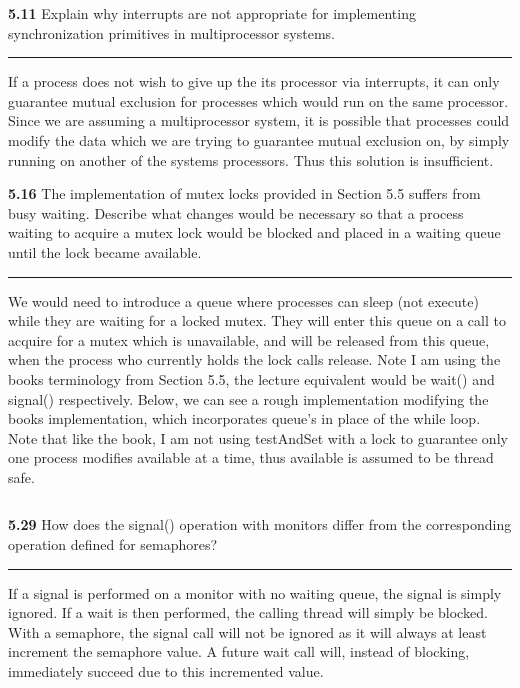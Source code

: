 \documentclass[12pt]{jhwhw}
\begin{document}
\textbf{5.11}  
	Explain why interrupts are not appropriate for implementing synchronization
	primitives in multiprocessor systems.
\textcolor[RGB]{240,240,240}{\rule{\textwidth}{0.5pt}}\bigbreak

	\begin{addmargin}[1em]{}
		If a process does not wish to give up the its processor via interrupts, it
		can only guarantee mutual exclusion for processes which would run on the
		same processor. Since we are assuming a multiprocessor system, it is possible
		that processes could modify the data which we are trying to guarantee mutual
		exclusion on, by simply running on another of the systems processors.
		Thus this solution is insufficient.
	\end{addmargin}
	\bigbreak

\textbf{5.16}  
	The implementation of mutex locks provided in Section 5.5 suffers
	from busy waiting. Describe what changes would be necessary so that a process 
	waiting to acquire a mutex lock would be blocked and placed in a waiting queue
	until the lock became available.
\textcolor[RGB]{240,240,240}{\rule{\textwidth}{0.5pt}}\bigbreak

	\begin{addmargin}[1em]{}
		We would need to introduce a queue where processes  can sleep (not execute)
		while they are waiting for a locked mutex. They will enter this queue
		on a call to acquire for a mutex which is unavailable, and will be released
		from this queue, when the process who currently holds the lock calls release.
		Note I am using the books terminology from Section 5.5, the lecture equivalent
		would be wait() and signal() respectively.
		Below, we can see a rough implementation modifying the books implementation,
		which incorporates queue's in place of the while loop.
		Note that like the book, I am not using testAndSet with a lock to guarantee
		only one process modifies available at a time, thus available is assumed to 
		be thread safe.

		\inputminted{c}{5.16.c}
	\end{addmargin}
	\bigbreak

\textbf{5.29}  
	How does the signal() operation with monitors differ from the corresponding
	operation defined for semaphores?
\textcolor[RGB]{240,240,240}{\rule{\textwidth}{0.5pt}}\bigbreak

	\begin{addmargin}[1em]{}
		If a signal is performed on a monitor with no waiting queue, the signal is
		simply ignored. If a wait is then performed, the calling thread will simply
		be blocked. With a semaphore, the signal call will not be ignored as it will
		always at least increment the semaphore value. A future wait call will, instead
		of blocking, immediately succeed due to this incremented value.
	\end{addmargin}
	\bigbreak
\end{document}
